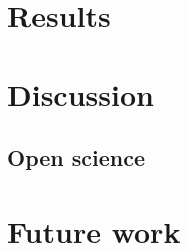 \documentclass[prodmode,acmtochi]{acmsmall} %
\begin{document}
\section{Results}

\section{Discussion}











	

\subsection{Open science}



\section{Future work}




\end{document}
